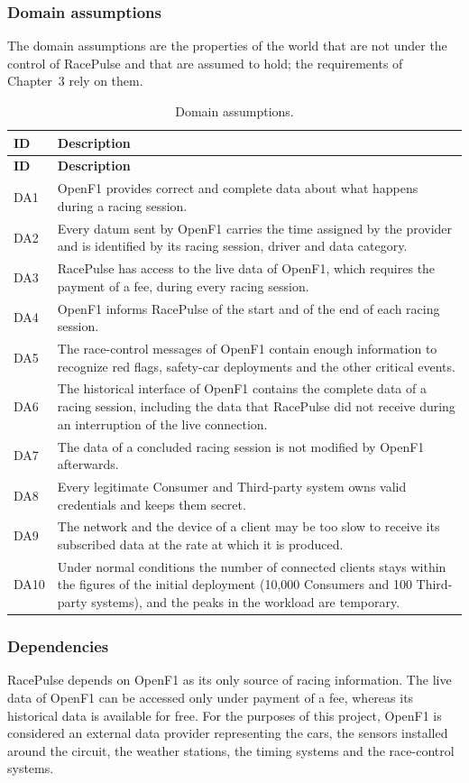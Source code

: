 \documentclass[11pt,a4paper]{article}
\newcommand{\RP}{RacePulse}
\begin{document}
\subsubsection{Domain assumptions}
The domain assumptions are the properties of the world that are not under the control of \RP{} and that are
assumed to hold; the requirements of Chapter~3 rely on them.
\begin{longtable}{@{}L{1.4cm} L{13.3cm}@{}}
\caption{Domain assumptions.}\label{tab:da}\\
\toprule \textbf{ID} & \textbf{Description}\\ \midrule \endfirsthead
\toprule \textbf{ID} & \textbf{Description}\\ \midrule \endhead
\bottomrule \endfoot
DA1 & OpenF1 provides correct and complete data about what happens during a racing session.\\
DA2 & Every datum sent by OpenF1 carries the time assigned by the provider and is identified by its racing session, driver and data category.\\
DA3 & \RP{} has access to the live data of OpenF1, which requires the payment of a fee, during every racing session.\\
DA4 & OpenF1 informs \RP{} of the start and of the end of each racing session.\\
DA5 & The race-control messages of OpenF1 contain enough information to recognize red flags, safety-car deployments and the other critical events.\\
DA6 & The historical interface of OpenF1 contains the complete data of a racing session, including the data that \RP{} did not receive during an interruption of the live connection.\\
DA7 & The data of a concluded racing session is not modified by OpenF1 afterwards.\\
DA8 & Every legitimate Consumer and Third-party system owns valid credentials and keeps them secret.\\
DA9 & The network and the device of a client may be too slow to receive its subscribed data at the rate at which it is produced.\\
DA10 & Under normal conditions the number of connected clients stays within the figures of the initial deployment (10{,}000 Consumers and 100 Third-party systems), and the peaks in the workload are temporary.\\
\end{longtable}


\subsubsection{Dependencies}
\RP{} depends on OpenF1 as its only source of racing information. The live data of OpenF1 can be accessed only
under payment of a fee, whereas its historical data is available for free. For the purposes of this project,
OpenF1 is considered an external data provider representing the cars, the sensors installed around the circuit, the
weather stations, the timing systems and the race-control systems.
\end{document}
